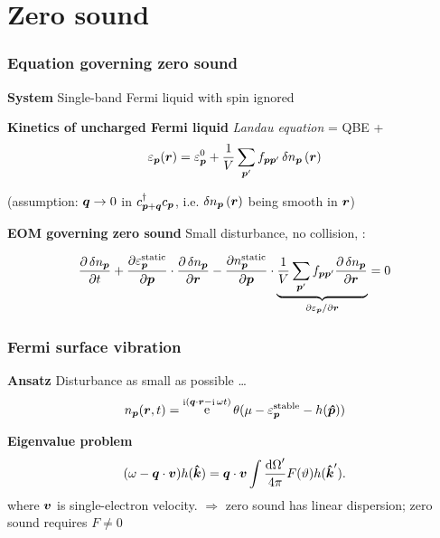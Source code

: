 \documentclass{beamer}
\DeclareMathOperator{\ee}{e}
\DeclareMathOperator{\ii}{i}
\begin{document}
\section{Zero sound}

\begin{frame}
\frametitle{Equation governing zero sound}

\textbf{System} Single-band Fermi liquid with spin ignored 

\vspace{0.5cm}

\textbf{Kinetics of uncharged Fermi liquid} \emph{Landau equation} = QBE + 
\begin{equation}
    \varepsilon_{\vb*{p}}(\vb*{r}) = \varepsilon^0_{\vb*{p}}
    + \frac{1}{V} \sum_{\vb*{p}'} f_{\vb*{p} \vb*{p}'} \var{n}_{\vb*{p}}(\vb*{r}) 
\end{equation}

(assumption: $\vb*{q} \to 0$ in $c^\dagger_{\vb*{p} + \vb*{q}} c_{\vb*{p}}$, 
i.e. $\var{n}_{\vb*{p}}(\vb*{r})$ being smooth in $\vb*{r}$)

\vspace{0.5cm}

\textbf{EOM governing zero sound} Small disturbance, no collision, :

\begin{equation}
    \pdv{\var{n}_{\vb*{p}}}{t} 
    + \pdv{\varepsilon^{\text{static}}_{\vb*{p}}}{\vb*{p}} 
    \cdot \pdv{\var{n}_{\vb*{p}}}{\vb*{r}}
    - \pdv{n^{\text{static}}_{\vb*{p}}}{\vb*{p}} \cdot 
    \underbrace{\frac{1}{V} \sum_{\vb*{p}'} f_{\vb*{p} \vb*{p}'} \pdv{\var{n_{\vb*{p}}}}{\vb*{r}}}_{\pdv*{\varepsilon_{\vb*{p}}}{\vb*{r}}} = 0
\end{equation}

\end{frame}

\begin{frame}
\frametitle{Fermi surface vibration}

\textbf{Ansatz} Disturbance as small as possible \dots
\begin{equation}
    {n}_{\vb*{p}}(\vb*{r}, t) = \ee^{\ii (\vb*{q} \cdot \vb*{r} - \ii \omega t)} 
    \theta(\mu - \varepsilon_{\vb*{p}}^{\text{stable}} - h(\vu*{p}))
\end{equation}    

\begin{center}
    
\end{center}

\textbf{Eigenvalue problem} \begin{equation}
    (\omega - \vb*{q} \cdot \vb*{v}) h(\vu*{k})
    = \vb*{q} \cdot \vb*{v} \int \frac{\dd{\Omega}'}{4\pi} F(\vartheta) h(\vu*{k}').
\end{equation}
where $\vb*{v}$ is single-electron velocity. $\Rightarrow$ zero sound has linear dispersion;
zero sound requires $F \neq 0$

\end{frame}
\end{document}
